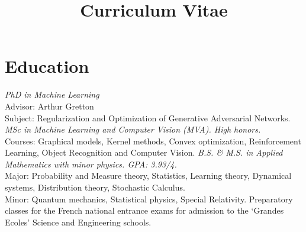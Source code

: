 \documentclass[11pt,a4paper,sans]{moderncv} %
\title{Curriculum Vitae }
\begin{document}
\makecvtitle %


\section{Education}
{\textit{PhD in Machine Learning\\}
Advisor: Arthur Gretton\\
Subject: Regularization and Optimization of Generative Adversarial Networks.} 
{\textit{MSc in Machine Learning and Computer Vision (MVA). High honors.\\}
Courses: Graphical models, Kernel methods, Convex optimization, Reinforcement Learning, Object Recognition and Computer Vision. } %
{\textit{B.S. \& M.S. in Applied Mathematics with minor physics. GPA: 3.93/4.\\}
Major: Probability and Measure theory, Statistics, Learning theory, Dynamical systems, Distribution theory, Stochastic Calculus.\\ 
Minor: Quantum mechanics, Statistical physics, Special Relativity. 
}
{}{Preparatory classes for the French national entrance exams for admission to the ‘Grandes Ecoles’ Science and Engineering schools.
}

 
\end{document}
